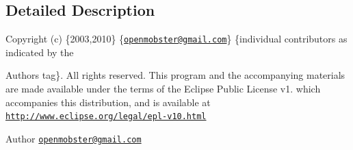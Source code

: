 \subsection{\-Detailed \-Description}
\-Copyright (c) \{2003,2010\} \{\href{mailto:openmobster@gmail.com}{\tt openmobster@gmail.\-com}\} \{individual contributors as indicated by the \begin{DoxyAuthor}{\-Authors}
tag\}. \-All rights reserved. \-This program and the accompanying materials are made available under the terms of the \-Eclipse \-Public \-License v1. which accompanies this distribution, and is available at \href{http://www.eclipse.org/legal/epl-v10.html}{\tt http\-://www.\-eclipse.\-org/legal/epl-\/v10.\-html}
\end{DoxyAuthor}
\begin{DoxyAuthor}{\-Author}
\href{mailto:openmobster@gmail.com}{\tt openmobster@gmail.\-com} 
\end{DoxyAuthor}


